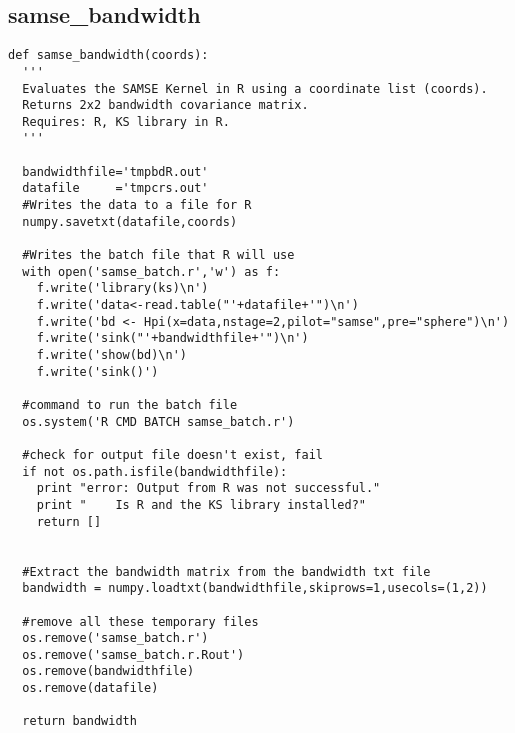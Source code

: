 \documentclass[12pt,letter]{article}
\begin{document}
\subsection{samse\_bandwidth}
\begin{verbatim}
def samse_bandwidth(coords):
  '''
  Evaluates the SAMSE Kernel in R using a coordinate list (coords).
  Returns 2x2 bandwidth covariance matrix.
  Requires: R, KS library in R.
  '''
  
  bandwidthfile='tmpbdR.out'
  datafile     ='tmpcrs.out'
  #Writes the data to a file for R
  numpy.savetxt(datafile,coords)
  
  #Writes the batch file that R will use
  with open('samse_batch.r','w') as f:
    f.write('library(ks)\n')
    f.write('data<-read.table("'+datafile+'")\n')
    f.write('bd <- Hpi(x=data,nstage=2,pilot="samse",pre="sphere")\n')
    f.write('sink("'+bandwidthfile+'")\n')
    f.write('show(bd)\n')
    f.write('sink()')
  
  #command to run the batch file
  os.system('R CMD BATCH samse_batch.r')
  
  #check for output file doesn't exist, fail
  if not os.path.isfile(bandwidthfile):
    print "error: Output from R was not successful."
    print "    Is R and the KS library installed?"
    return []
  
  
  #Extract the bandwidth matrix from the bandwidth txt file
  bandwidth = numpy.loadtxt(bandwidthfile,skiprows=1,usecols=(1,2))
  
  #remove all these temporary files
  os.remove('samse_batch.r')
  os.remove('samse_batch.r.Rout')
  os.remove(bandwidthfile)
  os.remove(datafile)
  
  return bandwidth
\end{verbatim}

\end{document}
